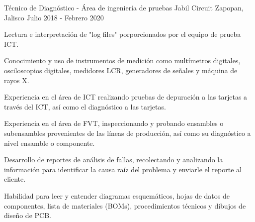 


\begin{cventries}


\cventry
{Técnico de Diagnóstico - Área de ingeniería de pruebas} %
{Jabil Circuit} %
{Zapopan, Jalisco} %
{Julio 2018 - Febrero 2020} %
{ %
\begin{cvitems}
\item {Lectura e interpretación de "log files" porporcionados por el equipo de prueba ICT.}
\item {Conocimiento y uso de instrumentos de medición como multímetros digitales, osciloscopios digitales, medidores LCR, generadores de señales y máquina de rayos X}.
\item {Experiencia en el área de ICT realizando pruebas de depuración a las tarjetas a través del ICT, así como el diagnóstico a las tarjetas.}
\item {Experiencia en el área de FVT, inspeccionando y probando ensambles o subensambles provenientes de las líneas de producción, así como su diagnóstico a nivel ensamble o componente. }
\item {Desarrollo de reportes de análisis de fallas, recolectando y analizando la información para identificar la causa raíz del problema y enviarle el reporte al cliente.}
\item {Habilidad para leer y entender diagramas esquemáticos, hojas de datos de componentes, lista de materiales (BOMs), procedimientos técnicos y dibujos de diseño de PCB.}
\end{cvitems}
}



\end{cventries}
